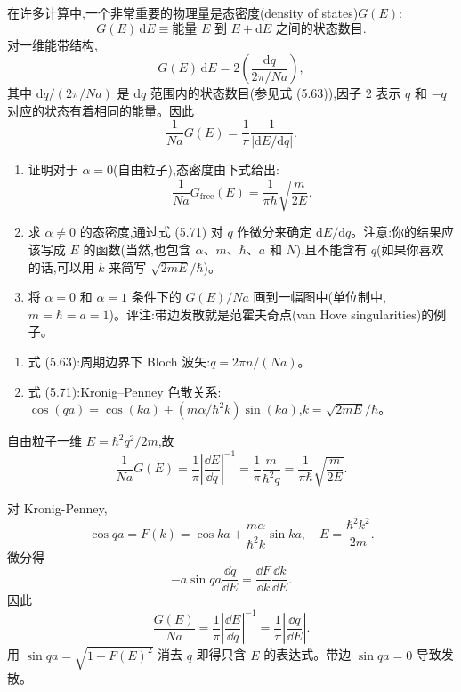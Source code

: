 \begin{question}
在许多计算中,一个非常重要的物理量是态密度(density of states)$G(E)$:
\[
G(E)\,\mathrm dE\equiv \text{能量 }E\text{ 到 }E+\mathrm dE\text{ 之间的状态数目}.
\]
对一维能带结构,
\[
G(E)\,\mathrm dE=2\left(\frac{\mathrm dq}{2\pi/Na}\right),
\]
其中 $\mathrm dq/(2\pi/Na)$ 是 $\mathrm dq$ 范围内的状态数目(参见式 (5.63)),因子 2 表示 $q$ 和 $-q$ 对应的状态有着相同的能量。因此
\[
\frac{1}{Na}G(E)=\frac{1}{\pi}\frac{1}{|\mathrm dE/\mathrm dq|}.
\]
\begin{enumerate}
\item 证明对于 $\alpha=0$(自由粒子),态密度由下式给出:
\[
\frac{1}{Na}G_{\mathrm{free}}(E)=\frac{1}{\pi\hbar}\sqrt{\frac{m}{2E}}.
\]
\item 求 $\alpha\ne0$ 的态密度,通过式 (5.71) 对 $q$ 作微分来确定 $\mathrm dE/\mathrm dq$。注意:你的结果应该写成 $E$ 的函数(当然,也包含 $\alpha$、$m$、$\hbar$、$a$ 和 $N$),且不能含有 $q$(如果你喜欢的话,可以用 $k$ 来简写 $\sqrt{2mE}/\hbar$)。
\item 将 $\alpha=0$ 和 $\alpha=1$ 条件下的 $G(E)/Na$ 画到一幅图中(单位制中,$m=\hbar=a=1$)。评注:带边发散就是范霍夫奇点(van Hove singularities)的例子。
\end{enumerate}

\par\smallskip
{}
\begin{enumerate}[leftmargin=2.2em,itemsep=0.12em,topsep=0.12em,parsep=0pt]
\item 式 (5.63):周期边界下 Bloch 波矢:$q=2\pi n/(Na)$。
\item 式 (5.71):Kronig--Penney 色散关系:$\cos(qa)=\cos(ka)+(m\alpha/\hbar^2k)\sin(ka)$,$k=\sqrt{2mE}/\hbar$。
\end{enumerate}

\begin{solution}

自由粒子一维 $E=\hbar^2q^2/2m$,故
\[
\frac{1}{Na}G(E)=\frac1\pi\left|\frac{\dd E}{\dd q}\right|^{-1}
=\frac1\pi\frac{m}{\hbar^2q}
=\frac{1}{\pi\hbar}\sqrt{\frac{m}{2E}}.
\]

对 Kronig-Penney,
\[
\cos qa=F(k)=\cos ka+\frac{m\alpha}{\hbar^2k}\sin ka,
\quad E=\frac{\hbar^2k^2}{2m}.
\]
微分得
\[
-a\sin qa\frac{\dd q}{\dd E}=\frac{\dd F}{\dd k}\frac{\dd k}{\dd E}.
\]
因此
\[
\frac{G(E)}{Na}=\frac1\pi\left|\frac{\dd E}{\dd q}\right|^{-1}
=\frac1\pi\left|\frac{\dd q}{\dd E}\right|.
\]
用 $\sin qa=\sqrt{1-F(E)^2}$ 消去 $q$ 即得只含 $E$ 的表达式。带边 $\sin qa=0$ 导致发散。

\end{solution}
\end{question}

